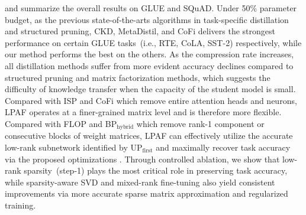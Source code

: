 and  summarize the overall results on GLUE and SQuAD. Under 50\% parameter budget, as the previous state-of-the-arts algorithms in task-specific distillation and structured pruning, CKD, MetaDistil, and CoFi delivers the strongest performance on certain GLUE tasks~(i.e., RTE, CoLA, SST-2) respectively, while our method performs the best on the others. As the compression rate increases, all distillation methods suffer from more evident accuracy declines compared to structured pruning and matrix factorization methods, which suggests the difficulty of knowledge transfer when the capacity of the student model is small. Compared with ISP and CoFi which remove entire attention heads and neurons, LPAF operates at a finer-grained matrix level and is therefore more flexible. Compared with FLOP and BP$_{\text{hybrid}}$ which remove rank-1 component or consecutive blocks of weight matrices, LPAF can effectively utilize the accurate low-rank subnetwork identified by UP$_{\text{first}}$ and maximally recover task accuracy via the proposed optimizations . Through controlled ablation, we show that low-rank sparsity~(step-1) plays the most critical role in preserving task accuracy, while sparsity-aware SVD and mixed-rank fine-tuning also yield consistent improvements via more accurate sparse matrix approximation and regularized training.


